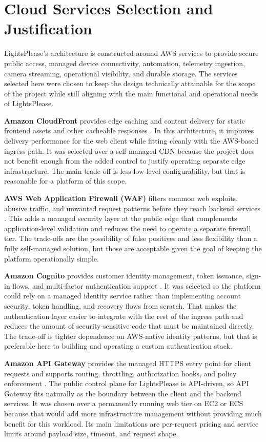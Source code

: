 \section{Cloud Services Selection and Justification}
LightsPlease's architecture is constructed around AWS services to provide secure public access, managed device connectivity, automation, telemetry ingestion, camera streaming, operational visibility, and durable storage. The services selected here were chosen to keep the design technically attainable for the scope of the project while still aligning with the main functional and operational needs of LightsPlease.

\textbf{Amazon CloudFront} provides edge caching and content delivery for static frontend assets and other cacheable responses \cite{aws-cloudfront}. In this architecture, it improves delivery performance for the web client while fitting cleanly with the AWS-based ingress path. It was selected over a self-managed CDN because the project does not benefit enough from the added control to justify operating separate edge infrastructure. The main trade-off is less low-level configurability, but that is reasonable for a platform of this scope.

\textbf{AWS Web Application Firewall (WAF)} filters common web exploits, abusive traffic, and unwanted request patterns before they reach backend services \cite{aws-waf}. This adds a managed security layer at the public edge that complements application-level validation and reduces the need to operate a separate firewall tier. The trade-offs are the possibility of false positives and less flexibility than a fully self-managed solution, but those are acceptable given the goal of keeping the platform operationally simple.

\textbf{Amazon Cognito} provides customer identity management, token issuance, sign-in flows, and multi-factor authentication support \cite{aws-cognito}. It was selected so the platform could rely on a managed identity service rather than implementing account security, token handling, and recovery flows from scratch. That makes the authentication layer easier to integrate with the rest of the ingress path and reduces the amount of security-sensitive code that must be maintained directly. The trade-off is tighter dependence on AWS-native identity patterns, but that is preferable here to building and operating a custom authentication stack.

\textbf{Amazon API Gateway} provides the managed HTTPS entry point for client requests and supports routing, throttling, authorization hooks, and policy enforcement \cite{aws-api-gateway}. The public control plane for LightsPlease is API-driven, so API Gateway fits naturally as the boundary between the client and the backend services. It was chosen over a permanently running web tier on EC2 or ECS because that would add more infrastructure management without providing much benefit for this workload. Its main limitations are per-request pricing and service limits around payload size, timeout, and request shape.


